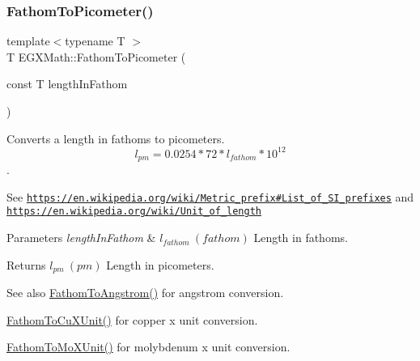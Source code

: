 \subsubsection{\texorpdfstring{Fathom\+To\+Picometer()}{FathomToPicometer()}}
{\footnotesize\ttfamily template$<$typename T $>$ \\
T E\+G\+X\+Math\+::\+Fathom\+To\+Picometer (\begin{DoxyParamCaption}\item[{const T}]{length\+In\+Fathom }\end{DoxyParamCaption})}



Converts a length in fathoms to picometers. \[ l_{pm}=0.0254 * 72 * l_{fathom} * 10^{12} \]. 

See \href{https://en.wikipedia.org/wiki/Metric_prefix#List_of_SI_prefixes}{\tt https\+://en.\+wikipedia.\+org/wiki/\+Metric\+\_\+prefix\#\+List\+\_\+of\+\_\+\+S\+I\+\_\+prefixes} and \href{https://en.wikipedia.org/wiki/Unit_of_length}{\tt https\+://en.\+wikipedia.\+org/wiki/\+Unit\+\_\+of\+\_\+length} 
\begin{DoxyParams}{Parameters}
{\em length\+In\+Fathom} & $ l_{fathom}\ (fathom)$ Length in fathoms. \\
\hline
\end{DoxyParams}
\begin{DoxyReturn}{Returns}
$ l_{pm}\ (pm)$ Length in picometers. 
\end{DoxyReturn}
\begin{DoxySeeAlso}{See also}
\mbox{\hyperlink{group___e_g_x_math-_conversions-_length_conversions-_imperial-_fathom-_non-_s_i_gac03859840078c2a19cbf1f79bcf2b919}{Fathom\+To\+Angstrom()}} for angstrom conversion. 

\mbox{\hyperlink{group___e_g_x_math-_conversions-_length_conversions-_imperial-_fathom-_non-_s_i_ga6692d3fad4af03d78145e34bf0a6c2ac}{Fathom\+To\+Cu\+X\+Unit()}} for copper x unit conversion. 

\mbox{\hyperlink{group___e_g_x_math-_conversions-_length_conversions-_imperial-_fathom-_non-_s_i_ga1e69cf778d1b7f72cd015b6cc81fc71c}{Fathom\+To\+Mo\+X\+Unit()}} for molybdenum x unit conversion. 
\end{DoxySeeAlso}
\mbox{\label{group___e_g_x_math-_conversions-_length_conversions-_imperial-_fathom-_s_i_gade17d568b89bc6b268ca6acb38ca8863}} 

